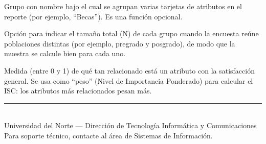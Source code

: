 \documentclass[12pt, letterpaper]{article}
\begin{document}
\begin{description}[leftmargin=2.5cm, style=nextline]
  \item[\textcolor{uninorteazul}{Categoría}]
    Grupo con nombre bajo el cual se agrupan varias tarjetas de atributos en el reporte (por ejemplo, ``Becas''). Es una función opcional.

  \item[\textcolor{uninorteazul}{Segmentación por población}]
    Opción para indicar el tamaño total (N) de cada grupo cuando la encuesta reúne poblaciones distintas (por ejemplo, pregrado y posgrado), de modo que la muestra se calcule bien para cada uno.

  \item[\textcolor{uninorteazul}{Correlación / NIP}]
    Medida (entre 0 y 1) de qué tan relacionado está un atributo con la satisfacción general. Se usa como ``peso'' (Nivel de Importancia Ponderado) para calcular el ISC: los atributos más relacionados pesan más.
\end{description}

\vfill
\begin{center}
  \color{grismedio}
  \rule{0.5\linewidth}{0.4pt}\\[6pt]
  \small Universidad del Norte — Dirección de Tecnología Informática y Comunicaciones\\
  Para soporte técnico, contacte al área de Sistemas de Información.
\end{center}
\end{document}

